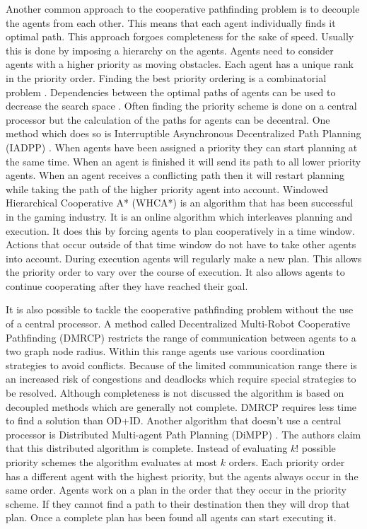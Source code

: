 Another common approach to the cooperative pathfinding problem is to decouple 
the agents from each other. This means that each agent individually finds it 
optimal path. This approach forgoes completeness for the sake of speed. 
Usually this is done by imposing a hierarchy on the agents. Agents need to 
consider agents with a higher priority as moving obstacles. Each agent has a 
unique rank in the priority order. Finding the best priority ordering is a 
combinatorial problem . Dependencies between the optimal paths of agents can be 
used to decrease the search space 
\citep{bennewitz2002}. Often finding the priority scheme is done on a central 
processor but the calculation of the paths for agents can be decentral. One 
method which does so is Interruptible Asynchronous Decentralized Path Planning 
(IADPP) \citep{cap2012}. When agents have been assigned a priority they can 
start planning at 
the same time. When an agent is finished it will send its path to all lower 
priority agents. When an agent receives a conflicting path then it will restart 
planning while taking the path of the higher priority 
agent into account. Windowed Hierarchical Cooperative A* (WHCA*) 
\citep{silver2005} is an algorithm that has been successful in the gaming 
industry. It is an online algorithm which interleaves planning and execution. 
It does this by forcing agents to plan cooperatively in a time window. Actions 
that occur outside of that time window do not have to take other agents into 
account. During execution agents will regularly make a new plan. This allows 
the priority order to vary over the course of 
execution. It also allows agents to continue cooperating after they have 
reached their goal.

It is also possible to tackle the cooperative pathfinding problem without the 
use of a central processor. A method called Decentralized Multi-Robot 
Cooperative Pathfinding (DMRCP) \citep{wei2016} restricts the 
range of communication between agents to a two graph node radius. Within this 
range agents use various coordination strategies to avoid conflicts. Because of 
the limited communication range there is an increased risk of congestions and 
deadlocks which require special strategies to be resolved. Although 
completeness is not discussed the algorithm is based on decoupled methods which 
are generally not complete. DMRCP requires less time to find a solution than 
OD+ID. Another algorithm that doesn't use a central processor is Distributed 
Multi-agent Path Planning (DiMPP) \citep{chouhan2017}. The authors claim that 
this distributed algorithm is complete. Instead of evaluating 
$k!$ possible priority schemes the algorithm evaluates at most $k$ orders. Each 
priority order has a different agent with the highest priority, but the agents 
always occur in the same order. Agents work on a plan in the order that they 
occur in the priority scheme. If they cannot find a path to their destination 
then they will drop that plan. Once a complete plan has been found all agents 
can start executing it.

